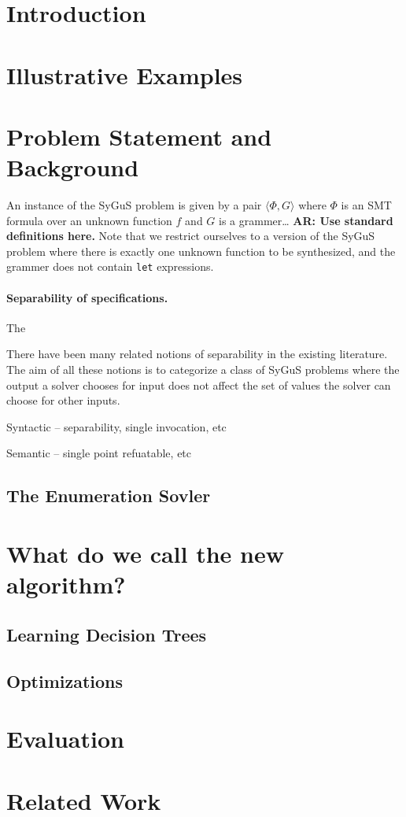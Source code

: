 \documentclass{llncs}
\newcommand\arsays[1]{{\bf AR: #1}}
\newcommand\tuple[1]{\langle #1 \rangle}
\begin{document}
\section{Introduction}
\label{sec:intro}

\section{Illustrative Examples}
\label{sec:example}

\section{Problem Statement and Background}
\label{sec:problem}

An instance of the SyGuS problem is given by a pair $\tuple { \Phi, G }$
where $\Phi$ is an SMT formula over an unknown function $f$ and $G$ is a
grammer\dots
\arsays{Use standard definitions here.}
Note that we restrict ourselves to a version of the SyGuS problem where
there is exactly one unknown function to be synthesized, and the grammer
does not contain {\tt let} expressions.


\paragraph{Separability of specifications.}
The

\begin{remark}
  There have been many related notions of separability in the existing
  literature.
  The aim of all these notions is to categorize a class of SyGuS
  problems where the output a solver chooses for input does not affect
  the set of values the solver can choose for other inputs.

  Syntactic -- separability, single invocation, etc

  Semantic -- single point refuatable, etc
\end{remark}

\subsection{The Enumeration Sovler}
\label{sec:enumeration}

\section{What do we call the new algorithm?}
\label{sec:algo}

\subsection{Learning Decision Trees}
\label{sec:decision_trees}

\subsection{Optimizations}
\label{sec:optimizations}

\section{Evaluation}
\label{sec:evaluation}

\section{Related Work}
\label{sec:related_work}

\
\end{document}
